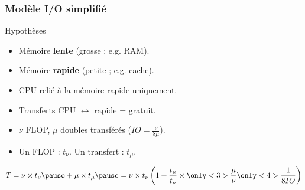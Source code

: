 \documentclass[xcolor={x11names,svgnames}, 14pt]{beamer}
\begin{document}
\begin{frame}
  \frametitle{Modèle I/O simplifié}

  \begin{block}{Hypothèses}
  \begin{itemize}
  \item Mémoire \textbf{lente} (grosse ; e.g. RAM).
  \item Mémoire \textbf{rapide} (petite ; e.g. cache).
  \item CPU relié à la mémoire rapide uniquement.
  \item Transferts CPU $\leftrightarrow$ rapide = \alert{gratuit}.
  \end{itemize}
\end{block}

\begin{itemize}
  \item $\nu$ FLOP, $\mu$ doubles transférés ($IO = \frac{\nu}{8\mu}$). 
  \item Un FLOP : $t_\nu$. Un transfert : $t_\mu$.
  \end{itemize}
  \[
  T = \nu \times t_\nu \pause + \mu \times t_\mu \pause = \nu \times t_\nu \left(1 + \frac{t_\mu}{t_\nu} \times \only<3>{\frac{\mu}{\nu}}\only<4>{\frac{1}{8IO}} \right)
\]

\end{frame}







              
              
\end{document}
